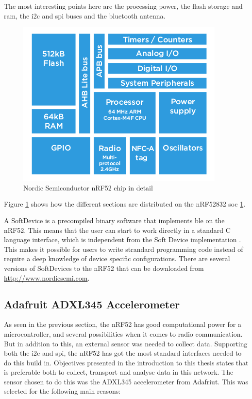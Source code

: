 \noindent The most interesting points here are the processing power, the flash storage and \gls{ram}, the \gls{i2c} and \gls{spi} buses and the bluetooth antenna. 



\begin{figure}[ht]
    \centering
    \includegraphics[scale=0.6]{nrf52Detailed.png}    
    \caption{Nordic Semiconductor nRF52 chip in detail }
    \label{fig:nrf52chipDetail}
\end{figure} 

\noindent Figure \ref{fig:nrf52chipDetail} shows how the different sections are distributed on the nRF52832 \gls{soc} \ref{fig:nrf52chipDetail}.  

\noindent A SoftDevice is a precompiled binary software that implements \gls{ble} on the nRF52. This means that the user can start to work directly in a standard C language interface, which is independent from the Soft Device implementation \cite{softDevice}. This makes it possible for users to write strandard programming code instead of require a deep knowledge of device specific configurations. There are several versions of SoftDevices to the nRF52 that can be downloaded from \url{http://www.nordicsemi.com}. 


\subsection{Adafruit ADXL345 Accelerometer}

\noindent As seen in the previous section, the nRF52 has good computational power for a \gls{microcontroller}, and several possibilities when it comes to radio communication. But in addition to this, an external sensor was needed to collect data. Supporting both the \gls{i2c} and \gls{spi}, the nRF52 has got the most standard interfaces needed to do this build in. Objectives presented in the introduction to this thesis states that is preferable both to collect, transport and analyse data in this network. The sensor chosen to do this was the ADXL345 accelerometer from Adafriut. This was selected for the following main reasons:  

